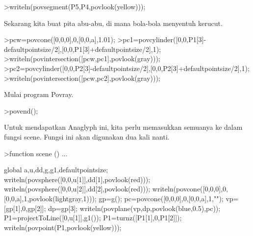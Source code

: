 \documentclass[a4paper,10pt]{article}
\begin{document}
\begin{eulernotebook}
\begin{eulercomment}
\begin{eulercomment}
\begin{eulercomment}
\begin{eulercomment}
\begin{eulercomment}
\begin{eulercomment}
\begin{eulercomment}
\begin{eulercomment}
\begin{eulercomment}
\begin{eulercomment}
\begin{eulercomment}
\begin{eulercomment}
\begin{eulercomment}
\begin{eulercomment}
\begin{eulercomment}
\begin{eulercomment}
\begin{eulercomment}
\begin{eulercomment}
\begin{eulercomment}
\begin{eulercomment}
\begin{eulercomment}
\begin{eulercomment}
\begin{eulercomment}
\begin{eulercomment}
\begin{eulercomment}
\begin{eulercomment}
\begin{eulercomment}
\begin{eulercomment}
\begin{eulercomment}
\begin{eulercomment}
\begin{eulercomment}
\begin{eulercomment}
\begin{eulercomment}
\begin{eulercomment}
\begin{eulerprompt}
>writeln(povsegment(P5,P4,povlook(yellow)));
\end{eulerprompt}
\begin{eulercomment}
Sekarang kita buat pita abu-abu, di mana bola-bola menyentuh kerucut.
\end{eulercomment}
\begin{eulerprompt}
>pcw=povcone([0,0,0],0,[0,0,a],1.01);
>pc1=povcylinder([0,0,P1[3]-defaultpointsize/2],[0,0,P1[3]+defaultpointsize/2],1);
>writeln(povintersection([pcw,pc1],povlook(gray)));
>pc2=povcylinder([0,0,P2[3]-defaultpointsize/2],[0,0,P2[3]+defaultpointsize/2],1);
>writeln(povintersection([pcw,pc2],povlook(gray)));
\end{eulerprompt}
\begin{eulercomment}
Mulai program Povray.
\end{eulercomment}
\begin{eulerprompt}
>povend();
\end{eulerprompt}
\begin{eulercomment}
Untuk mendapatkan Anaglyph ini, kita perlu memasukkan semuanya ke
dalam fungsi scene. Fungsi ini akan digunakan dua kali nanti.
\end{eulercomment}
\begin{eulerprompt}
>function scene () ...
\end{eulerprompt}
\begin{eulerudf}
  global a,u,dd,g,g1,defaultpointsize;
  writeln(povsphere([0,0,u[1]],dd[1],povlook(red)));
  writeln(povsphere([0,0,u[2]],dd[2],povlook(red)));
  writeln(povcone([0,0,0],0,[0,0,a],1,povlook(lightgray,1)));
  gp=g();
  pc=povcone([0,0,0],0,[0,0,a],1,"");
  vp=[gp[1],0,gp[2]]; dp=gp[3];
  writeln(povplane(vp,dp,povlook(blue,0.5),pc));
  P1=projectToLine([0,u[1]],g1()); P1=turnz([P1[1],0,P1[2]]);
  writeln(povpoint(P1,povlook(yellow)));

\end{eulerudf}
\end{eulercomment}
\end{eulercomment}
\end{eulercomment}
\end{eulercomment}
\end{eulercomment}
\end{eulercomment}
\end{eulercomment}
\end{eulercomment}
\end{eulercomment}
\end{eulercomment}
\end{eulercomment}
\end{eulercomment}
\end{eulercomment}
\end{eulercomment}
\end{eulercomment}
\end{eulercomment}
\end{eulercomment}
\end{eulercomment}
\end{eulercomment}
\end{eulercomment}
\end{eulercomment}
\end{eulercomment}
\end{eulercomment}
\end{eulercomment}
\end{eulercomment}
\end{eulercomment}
\end{eulercomment}
\end{eulercomment}
\end{eulercomment}
\end{eulercomment}
\end{eulercomment}
\end{eulercomment}
\end{eulercomment}
\end{eulercomment}
\end{eulernotebook}
\end{document}
